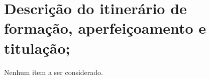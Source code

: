 \section{Descrição do itinerário de formação, aperfeiçoamento e titulação;}

Nenhum item a ser considerado.